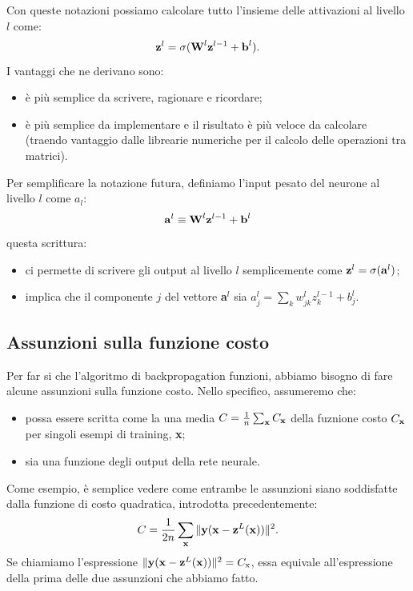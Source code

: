 Con queste notazioni possiamo calcolare tutto l'insieme delle attivazioni al livello $l$ come:
\begin{equation}
    \text{\textbf{z}}^l=\sigma(\text{\textbf{W}}^l\text{\textbf{z}}^{l-1}+\text{\textbf{b}}^l).
\end{equation}
I vantaggi che ne derivano sono:
\begin{itemize}
    \item è più semplice da scrivere, ragionare e ricordare;
    \item è più semplice da implementare e il risultato è più veloce da calcolare (traendo vantaggio dalle librearie numeriche per il calcolo delle operazioni tra matrici).
\end{itemize}
\newpage
Per semplificare la notazione futura, definiamo l'input pesato del neurone al livello $l$ come $a_l$:
\begin{equation}
    \text{\textbf{a}}^l\equiv\text{\textbf{W}}^l\text{\textbf{z}}^{l-1}+\text{\textbf{b}}^l
\end{equation}
questa scrittura:
\begin{itemize}
    \item ci permette di scrivere gli output al livello $l$ semplicemente come $\text{\textbf{z}}^l=\sigma(\text{\textbf{a}}^l)$;
    \item implica che il componente $j$ del vettore \textbf{a}$^l$ sia $a_j^l=\sum_k w_{jk}^l z^{l-1}_k + b_j^l$.
\end{itemize}

\subsection{Assunzioni sulla funzione costo} Per far si che l'algoritmo di backpropagation funzioni, abbiamo bisogno di fare alcune assunzioni sulla funzione costo. Nello specifico, assumeremo che:
\begin{itemize}
    \item possa essere scritta come la una media $C=\frac{1}{n}\sum_\text{\textbf{x}}C_\text{\textbf{x}}$ della fuznione costo $C_\text{\textbf{x}}$ per singoli esempi di training, \textbf{x};
    \item sia una funzione degli output della rete neurale.
\end{itemize}

Come esempio, è semplice vedere come entrambe le assunzioni siano soddisfatte dalla funzione di costo quadratica, introdotta precedentemente:
\begin{equation}
    C=\frac{1}{2n}\sum_\text{\textbf{x}}\|\text{\textbf{y}}(\text{\textbf{x}}-\text{\textbf{z}}^L(\text{\textbf{x}}))\|^2.
\end{equation}
Se chiamiamo l'espressione $\|\text{\textbf{y}}(\text{\textbf{x}}-\text{\textbf{z}}^L(\text{\textbf{x}}))\|^2 = C_\text{x}$, essa  equivale all'espressione della prima delle due assunzioni che abbiamo fatto.

